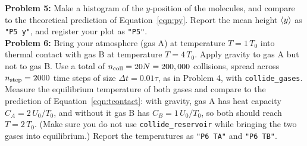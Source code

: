 \documentclass[12pt]{article}
\begin{document}
\noindent
{\bf Problem 5:} Make a histogram of the $y$-position of the
molecules, and compare to the theoretical prediction of
Equation~\ref{eqn:py}.  Report the mean height $\braket{y}$ as {\tt "P5
  y"}, and register your plot as {\tt "P5"}.\\[3pt]

\noindent
{\bf Problem 6:} Bring your atmosphere (gas A) at temperature $T=1\,
T_0$ into thermal contact with gas B at temperature $T=4\, T_0$.
Apply gravity to gas A but not to gas B.  Use a total of $n_{\rm coll}
= 20 N = 200,000$ collisions, spread across $n_{\rm step} = 2000$ time
steps of size $\Delta t = 0.01\tau$, as in Problem 4, with
{\tt collide\_gases}.  Measure the equilibrium temperature of both
gases and compare to the prediction of Equation~\ref{eqn:tcontact}:
with gravity, gas A has heat capacity $C_A = 2\,U_0/T_0$, and without
it gas B has $C_B = 1\,U_0/T_0$, so both should reach $T = 2\,T_0$.  (Make sure you do not use {\tt collide\_reservoir}
while bringing the two gases into equilibrium.)  Report the
temperatures as {\tt "P6 TA"} and {\tt "P6 TB"}.\\[3pt]
\end{document}
